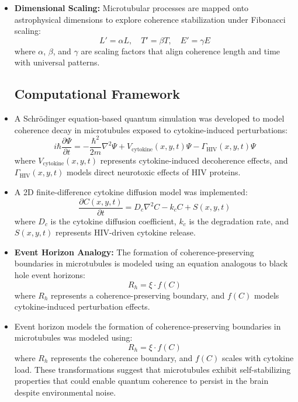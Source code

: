 \documentclass[entropy,article,submit,oneauthor,pdftex,]{Definitions/mdpi}
\begin{document}
\begin{itemize}
    \item \textbf{Dimensional Scaling:} Microtubular processes are mapped onto astrophysical dimensions to explore coherence stabilization under Fibonacci scaling:
    \begin{equation}
        L' = \alpha L, \quad T' = \beta T, \quad E' = \gamma E
        \label{eq:dim_scale}
    \end{equation}
    where $\alpha$, $\beta$, and $\gamma$ are scaling factors that align coherence length and time with universal patterns.
\subsection{Computational Framework}
\item A Schrödinger equation-based quantum simulation was developed to model coherence decay in microtubules exposed to cytokine-induced perturbations:
\begin{equation}
i\hbar \frac{\partial \Psi}{\partial t} = -\frac{\hbar^2}{2m} \nabla^2 \Psi + V_{\text{cytokine}}(x, y, t) \Psi - \Gamma_{\text{HIV}}(x, y, t) \Psi
\end{equation}
where \( V_{\text{cytokine}}(x, y, t) \) represents cytokine-induced decoherence effects, and \( \Gamma_{\text{HIV}}(x, y, t) \) models direct neurotoxic effects of HIV proteins.

\item A 2D finite-difference cytokine diffusion model was implemented:
\begin{equation}
\frac{\partial C(x, y, t)}{\partial t} = D_c \nabla^2 C - k_c C + S(x, y, t)
\end{equation}
where \( D_c \) is the cytokine diffusion coefficient, \( k_c \) is the degradation rate, and \( S(x, y, t) \) represents HIV-driven cytokine release.
\item \textbf{Event Horizon Analogy:} The formation of coherence-preserving boundaries in microtubules is modeled using an equation analogous to black hole event horizons:
    \begin{equation}
        R_h = \xi \cdot f(C)
        \label{eq:event_horizon}
    \end{equation}
    where $R_h$ represents a coherence-preserving boundary, and $f(C)$ models cytokine-induced perturbation effects.
\item Event horizon models the formation of coherence-preserving boundaries in microtubules was modeled using:
\begin{equation}
R_h = \xi \cdot f(C)
\end{equation}
where $R_h$ represents the coherence boundary, and $f(C)$ scales with cytokine load.
These transformations suggest that microtubules exhibit self-stabilizing properties that could enable quantum coherence to persist in the brain despite environmental noise.
\end{itemize}
\end{document}
